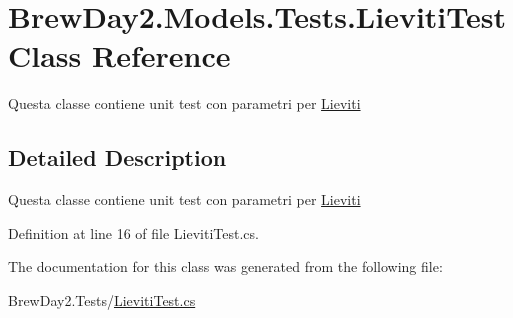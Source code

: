 \hypertarget{class_brew_day2_1_1_models_1_1_tests_1_1_lieviti_test}{}\section{Brew\+Day2.\+Models.\+Tests.\+Lieviti\+Test Class Reference}
\label{class_brew_day2_1_1_models_1_1_tests_1_1_lieviti_test}


Questa classe contiene unit test con parametri per \mbox{\hyperlink{class_brew_day2_1_1_models_1_1_lieviti}{Lieviti}} 




\subsection{Detailed Description}
Questa classe contiene unit test con parametri per \mbox{\hyperlink{class_brew_day2_1_1_models_1_1_lieviti}{Lieviti}}



Definition at line 16 of file Lieviti\+Test.\+cs.



The documentation for this class was generated from the following file\+:\begin{DoxyCompactItemize}
\item 
Brew\+Day2.\+Tests/\mbox{\hyperlink{_lieviti_test_8cs}{Lieviti\+Test.\+cs}}\end{DoxyCompactItemize}
